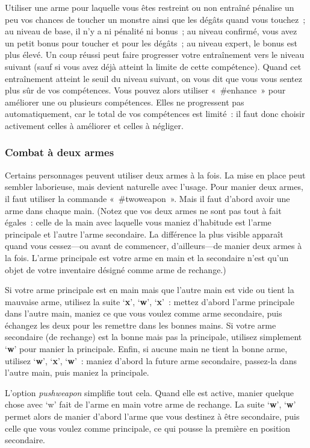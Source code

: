 \documentclass[titlepage]{article}
\begin{document}
Utiliser une arme pour laquelle vous êtes restreint ou non entraîné
pénalise un peu vos chances de toucher un monstre ainsi que les dégâts
quand vous touchez~; au niveau de base, il n'y a ni pénalité ni bonus~; au
niveau confirmé, vous avez un petit bonus pour toucher et pour les
dégâts~; au niveau expert, le bonus est plus élevé.
Un coup réussi peut faire progresser votre entraînement vers le niveau
suivant (sauf si vous avez déjà atteint la limite de cette compétence).
Quand cet entraînement atteint le seuil du niveau suivant, on vous dit
que vous vous sentez plus sûr de vos compétences.
Vous pouvez alors utiliser «~\#enhance~» pour améliorer une ou
plusieurs compétences.
Elles ne progressent pas automatiquement, car le total de vos compétences
est limité~: il faut donc choisir activement celles à améliorer et celles
à négliger.

\subsubsection{Combat à deux armes}



Certains personnages peuvent utiliser deux armes à la fois.
La mise en place peut sembler laborieuse, mais devient naturelle avec
l'usage.
Pour manier deux armes, il faut utiliser la commande «~\#twoweapon~».
Mais il faut d'abord avoir une arme dans chaque main.
(Notez que vos deux armes ne sont pas tout à fait égales~: celle de la main
avec laquelle vous maniez d'habitude est l'arme principale et l'autre
l'arme secondaire.
La différence la plus visible apparaît quand vous cessez---ou avant de
commencer, d'ailleurs---de manier deux armes à la fois.
L'arme principale est votre arme en main et la secondaire n'est qu'un
objet de votre inventaire désigné comme arme de rechange.)


Si votre arme principale est en main mais que l'autre main est vide ou
tient la mauvaise arme, utilisez la suite `\textbf{x}', `\textbf{w}',
`\textbf{x}'~: mettez d'abord l'arme principale dans l'autre main, maniez
ce que vous voulez comme arme secondaire, puis échangez les deux pour les
remettre dans les bonnes mains.
Si votre arme secondaire (de rechange) est la bonne mais pas la
principale, utilisez simplement `\textbf{w}' pour manier la principale.
Enfin, si aucune main ne tient la bonne arme, utilisez `\textbf{w}',
`\textbf{x}', `\textbf{w}'~: maniez d'abord la future arme secondaire,
passez-la dans l'autre main, puis maniez la principale.


L'option
\textit{pushweapon}
simplifie tout cela.
Quand elle est active, manier quelque chose avec `w' fait de l'arme en
main votre arme de rechange.
La suite `\textbf{w}', `\textbf{w}' permet alors de manier d'abord
l'arme que vous destinez à être secondaire, puis celle que vous voulez
comme principale, ce qui pousse la première en position secondaire.
\end{document}
